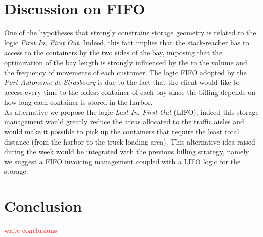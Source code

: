 \documentclass{article}
\newcommand{\ls}[1]{\textcolor{red}{#1}}
\newcommand{\PAS}{\emph{Port Autonome de Strasbourg }}
\begin{document}
\section{Discussion on FIFO}
One of the hypotheses that strongly constrains storage geometry is related to  the logic \textit{First In, First Out}. 
Indeed, this fact implies that the stack-reacher has to access to the containers by the two sides of the bay, imposing that the optimization of the bay length is strongly influenced by the to the volume and the frequency of movements of each customer. 
The logic FIFO adopted by the \PAS is due to the fact that the client would like to access every time to the oldest container of each bay since the billing depends on how long each container is stored in the harbor. \\
As alternative we propose the logic \textit{Last In, First Out} (LIFO), indeed this storage management would greatly reduce the areas allocated to the traffic aisles and would make it possible to pick up the containers that require the least total distance (from the harbor to the truck loading area). 
This alternative idea raised during the week would be integrated with the previous billing strategy, namely we suggest a FIFO invoicing management coupled with a LIFO logic for the storage.


\section{Conclusion}

\ls{write conclusions}




\end{document}
